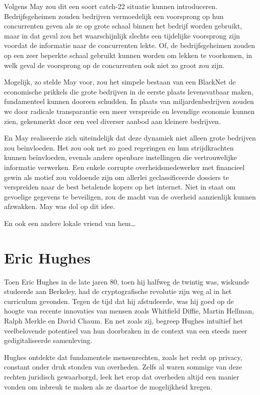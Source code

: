 \documentclass[smalldemyvopaper,11pt,twoside,onecolumn,openright,extrafontsizes,hidelinks]{memoir}
\begin{document}
Volgens May zou dit een soort catch-22 situatie kunnen introduceren.
Bedrijfsgeheimen zouden bedrijven vermoedelijk een voorsprong op hun
concurrenten geven als ze op grote schaal binnen het bedrijf worden
gebruikt, maar in dat geval zou het waarschijnlijk slechts een
tijdelijke voorsprong zijn voordat de informatie naar de concurrenten
lekte. Of, de bedrijfsgeheimen zouden op een zeer beperkte schaal
gebruikt kunnen worden om lekken te voorkomen, in welk geval de
voorsprong op de concurrenten ook niet zo groot zou zijn.

Mogelijk, zo stelde May voor, zou het simpele bestaan van een BlackNet
de economische prikkels die grote bedrijven in de eerste plaats
levensvatbaar maken, fundamenteel kunnen dooreen schudden. In plaats van
miljardenbedrijven zouden we door radicale transparantie een meer
verspreide en levendige economie kunnen zien, gekenmerkt door een veel
diverser aanbod aan kleinere bedrijven.

En May realiseerde zich uiteindelijk dat deze dynamiek niet alleen grote
bedrijven zou beïnvloeden. Het zou ook net zo goed regeringen en hun
strijdkrachten kunnen beïnvloeden, evenals andere openbare instellingen
die vertrouwelijke informatie verwerken. Een enkele corrupte
overheidsmedewerker met financieel gewin als motief zou voldoende zijn
om allerlei geclassificeerde dossiers te verspreiden naar de best
betalende kopers op het internet. Niet in staat om gevoelige gegevens te
beveiligen, zou de macht van de overheid aanzienlijk kunnen afzwakken.
May was dol op dit idee.

En ook een andere lokale vriend van hem\ldots{}

\section{Eric Hughes}\label{eric-hughes}

Toen Eric Hughes in de late jaren 80, toen hij halfweg de twintig was,
wiskunde studeerde aan Berkeley, had de cryptografische revolutie zijn
weg al in het curriculum gevonden. Tegen de tijd dat hij afstudeerde,
was hij goed op de hoogte van recente innovaties van mensen zoals
Whitfield Diffie, Martin Hellman, Ralph Merkle en David Chaum. En net
zoals zij, begreep Hughes intuïtief het veelbelovende potentieel van hun
doorbraken in de context van een steeds meer gedigitaliseerde
samenleving.

Hughes ontdekte dat fundamentele mensenrechten, zoals het recht op
privacy, constant onder druk stonden van overheden. Zelfs al waren
sommige van deze rechten juridisch gewaarborgd, leek het erop dat
overheden altijd een manier vonden om inbreuk te maken als ze daartoe de
mogelijkheid kregen.
\end{document}
